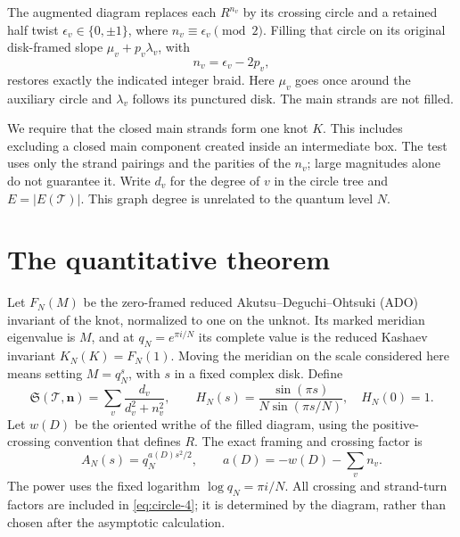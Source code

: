 The augmented diagram replaces each \(R^{n_v}\) by its crossing circle
and a retained half twist \(\epsilon_v\in\{0,\pm1\}\), where
\(n_v\equiv\epsilon_v\pmod2\). Filling that circle on its original
disk-framed slope \(\mu_v+p_v\lambda_v\), with \begin{equation}
                         n_v=\epsilon_v-2p_v,
 \label{eq:circle-2}
\end{equation} restores exactly the indicated integer braid. Here \(\mu_v\) goes
once around the auxiliary circle and \(\lambda_v\) follows its punctured
disk. The main strands are not filled.

We require that the closed main strands form one knot \(K\). This
includes excluding a closed main component created inside an
intermediate box. The test uses only the strand pairings and the
parities of the \(n_v\); large magnitudes alone do not guarantee it.
Write \(d_v\) for the degree of \(v\) in the circle tree and
\(E=|E(\mathcal T)|\). This graph degree is unrelated to the quantum
level \(N\).

\section{The quantitative theorem}\label{sec:circle-the-quantitative-theorem}

Let \(F_N(M)\) be the zero-framed reduced Akutsu--Deguchi--Ohtsuki (ADO)
invariant of the knot, normalized to one on the unknot. Its
marked meridian eigenvalue is \(M\), and at \(q_N=e^{\pi i/N}\) its
complete value is the reduced Kashaev invariant \(K_N(K)=F_N(1)\).
Moving the meridian on the scale considered here means setting
\(M=q_N^s\), with \(s\) in a fixed complex disk. Define \begin{equation}
 \mathfrak S(\mathcal T,\mathbf n)
       =\sum_v\frac{d_v}{d_v^2+n_v^2},\qquad
 H_N(s)=\frac{\sin(\pi s)}{N\sin(\pi s/N)},\quad H_N(0)=1.
 \label{eq:circle-3}
\end{equation} Let \(w(D)\) be the oriented writhe of the filled diagram,
using the positive-crossing convention that defines \(R\). The exact
framing and crossing factor is \begin{equation}
 A_N(s)=q_N^{a(D)s^2/2},\qquad
                         a(D)=-w(D)-\sum_v n_v.
 \label{eq:circle-4}
\end{equation} The power uses the fixed logarithm \(\log q_N=\pi i/N\). All crossing
and strand-turn factors are included in \eqref{eq:circle-4}; it is determined by the diagram, rather than chosen after the asymptotic calculation.

